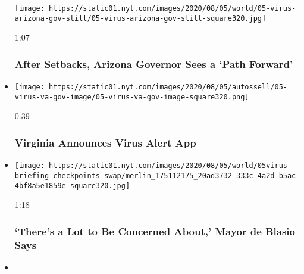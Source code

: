 \begin{itemize}
  \texttt{[image: https://static01.nyt.com/images/2020/08/05/world/05-virus-arizona-gov-still/05-virus-arizona-gov-still-square320.jpg]}

  1:07

  \hypertarget{after-setbacks-arizona-governor-sees-a-path-forward}{%
  \subsubsection{After Setbacks, Arizona Governor Sees a `Path
  Forward'}\label{after-setbacks-arizona-governor-sees-a-path-forward}}
\item
  \href{https://www.nytimes.com/video/us/100000007274757/viriginia-covid-contact-tracing-app.html?action=click\&module=video-series-bar\&region=header\&pgtype=Article\&playlistId=video/latest-video}{}

  \texttt{[image: https://static01.nyt.com/images/2020/08/05/autossell/05-virus-va-gov-image/05-virus-va-gov-image-square320.png]}

  0:39

  \hypertarget{virginia-announces-virus-alert-app}{%
  \subsubsection{Virginia Announces Virus Alert
  App}\label{virginia-announces-virus-alert-app}}
\item
  \href{https://www.nytimes.com/video/us/politics/100000007274695/new-york-quarantine-check-point.html?action=click\&module=video-series-bar\&region=header\&pgtype=Article\&playlistId=video/latest-video}{}

  \texttt{[image: https://static01.nyt.com/images/2020/08/05/world/05virus-briefing-checkpoints-swap/merlin\_175112175\_20ad3732-333c-4a2d-b5ac-4bf8a5e1859e-square320.jpg]}

  1:18

  \hypertarget{theres-a-lot-to-be-concerned-about-mayor-de-blasio-says}{%
  \subsubsection{`There's a Lot to Be Concerned About,' Mayor de Blasio
  Says}\label{theres-a-lot-to-be-concerned-about-mayor-de-blasio-says}}
\item
  \href{https://www.nytimes.com/video/world/middleeast/100000007274319/beirut-destruction.html?action=click\&module=video-series-bar\&region=header\&pgtype=Article\&playlistId=video/latest-video}{}


\end{itemize}
